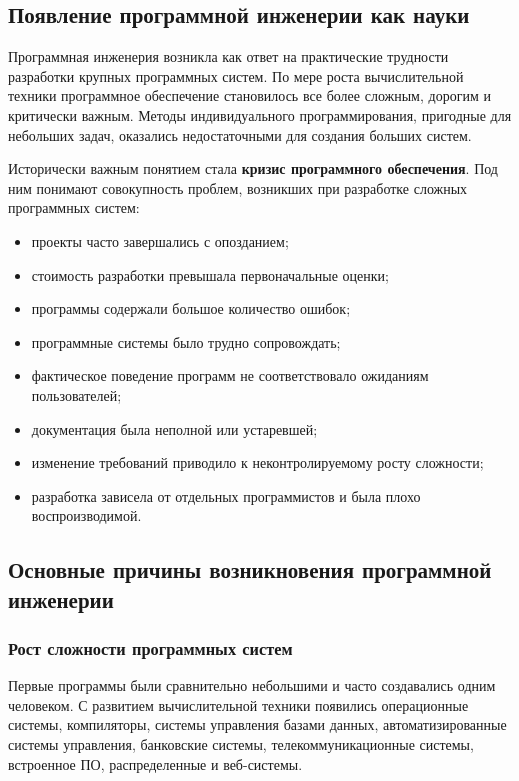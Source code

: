 \documentclass[12pt,a4paper]{article}
\begin{document}
\subsection{Появление программной инженерии как науки}

Программная инженерия возникла как ответ на практические трудности разработки крупных программных систем. По мере роста вычислительной техники программное обеспечение становилось все более сложным, дорогим и критически важным. Методы индивидуального программирования, пригодные для небольших задач, оказались недостаточными для создания больших систем.

Исторически важным понятием стала \textbf{кризис программного обеспечения}. Под ним понимают совокупность проблем, возникших при разработке сложных программных систем:

\begin{itemize}
    \item проекты часто завершались с опозданием;
    \item стоимость разработки превышала первоначальные оценки;
    \item программы содержали большое количество ошибок;
    \item программные системы было трудно сопровождать;
    \item фактическое поведение программ не соответствовало ожиданиям пользователей;
    \item документация была неполной или устаревшей;
    \item изменение требований приводило к неконтролируемому росту сложности;
    \item разработка зависела от отдельных программистов и была плохо воспроизводимой.
\end{itemize}

\subsection{Основные причины возникновения программной инженерии}

\subsubsection{Рост сложности программных систем}

Первые программы были сравнительно небольшими и часто создавались одним человеком. С развитием вычислительной техники появились операционные системы, компиляторы, системы управления базами данных, автоматизированные системы управления, банковские системы, телекоммуникационные системы, встроенное ПО, распределенные и веб-системы.
\end{document}
